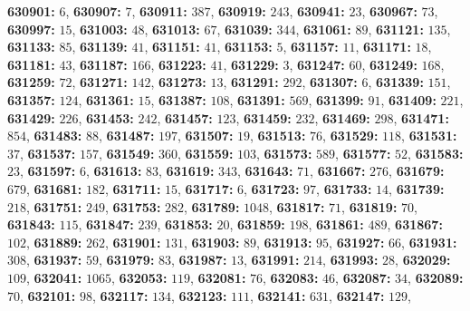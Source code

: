 \textsf{\bfseries 630901:} $6$, \textsf{\bfseries 630907:} $7$, \textsf{\bfseries 630911:} $387$, \textsf{\bfseries 630919:} $243$, \textsf{\bfseries 630941:} $23$, \textsf{\bfseries 630967:} $73$, \textsf{\bfseries 630997:} $15$, \textsf{\bfseries 631003:} $48$, \textsf{\bfseries 631013:} $67$, \textsf{\bfseries 631039:} $344$, \textsf{\bfseries 631061:} $89$, \textsf{\bfseries 631121:} $135$, \textsf{\bfseries 631133:} $85$, \textsf{\bfseries 631139:} $41$, \textsf{\bfseries 631151:} $41$, \textsf{\bfseries 631153:} $5$, \textsf{\bfseries 631157:} $11$, \textsf{\bfseries 631171:} $18$, \textsf{\bfseries 631181:} $43$, \textsf{\bfseries 631187:} $166$, \textsf{\bfseries 631223:} $41$, \textsf{\bfseries 631229:} $3$, \textsf{\bfseries 631247:} $60$, \textsf{\bfseries 631249:} $168$, \textsf{\bfseries 631259:} $72$, \textsf{\bfseries 631271:} $142$, \textsf{\bfseries 631273:} $13$, \textsf{\bfseries 631291:} $292$, \textsf{\bfseries 631307:} $6$, \textsf{\bfseries 631339:} $151$, \textsf{\bfseries 631357:} $124$, \textsf{\bfseries 631361:} $15$, \textsf{\bfseries 631387:} $108$, \textsf{\bfseries 631391:} $569$, \textsf{\bfseries 631399:} $91$, \textsf{\bfseries 631409:} $221$, \textsf{\bfseries 631429:} $226$, \textsf{\bfseries 631453:} $242$, \textsf{\bfseries 631457:} $123$, \textsf{\bfseries 631459:} $232$, \textsf{\bfseries 631469:} $298$, \textsf{\bfseries 631471:} $854$, \textsf{\bfseries 631483:} $88$, \textsf{\bfseries 631487:} $197$, \textsf{\bfseries 631507:} $19$, \textsf{\bfseries 631513:} $76$, \textsf{\bfseries 631529:} $118$, \textsf{\bfseries 631531:} $37$, \textsf{\bfseries 631537:} $157$, \textsf{\bfseries 631549:} $360$, \textsf{\bfseries 631559:} $103$, \textsf{\bfseries 631573:} $589$, \textsf{\bfseries 631577:} $52$, \textsf{\bfseries 631583:} $23$, \textsf{\bfseries 631597:} $6$, \textsf{\bfseries 631613:} $83$, \textsf{\bfseries 631619:} $343$, \textsf{\bfseries 631643:} $71$, \textsf{\bfseries 631667:} $276$, \textsf{\bfseries 631679:} $679$, \textsf{\bfseries 631681:} $182$, \textsf{\bfseries 631711:} $15$, \textsf{\bfseries 631717:} $6$, \textsf{\bfseries 631723:} $97$, \textsf{\bfseries 631733:} $14$, \textsf{\bfseries 631739:} $218$, \textsf{\bfseries 631751:} $249$, \textsf{\bfseries 631753:} $282$, \textsf{\bfseries 631789:} $1048$, \textsf{\bfseries 631817:} $71$, \textsf{\bfseries 631819:} $70$, \textsf{\bfseries 631843:} $115$, \textsf{\bfseries 631847:} $239$, \textsf{\bfseries 631853:} $20$, \textsf{\bfseries 631859:} $198$, \textsf{\bfseries 631861:} $489$, \textsf{\bfseries 631867:} $102$, \textsf{\bfseries 631889:} $262$, \textsf{\bfseries 631901:} $131$, \textsf{\bfseries 631903:} $89$, \textsf{\bfseries 631913:} $95$, \textsf{\bfseries 631927:} $66$, \textsf{\bfseries 631931:} $308$, \textsf{\bfseries 631937:} $59$, \textsf{\bfseries 631979:} $83$, \textsf{\bfseries 631987:} $13$, \textsf{\bfseries 631991:} $214$, \textsf{\bfseries 631993:} $28$, \textsf{\bfseries 632029:} $109$, \textsf{\bfseries 632041:} $1065$, \textsf{\bfseries 632053:} $119$, \textsf{\bfseries 632081:} $76$, \textsf{\bfseries 632083:} $46$, \textsf{\bfseries 632087:} $34$, \textsf{\bfseries 632089:} $70$, \textsf{\bfseries 632101:} $98$, \textsf{\bfseries 632117:} $134$, \textsf{\bfseries 632123:} $111$, \textsf{\bfseries 632141:} $631$, \textsf{\bfseries 632147:} $129$, 
